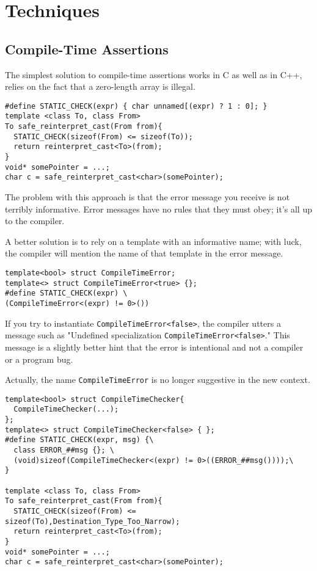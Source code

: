 \newpage
\section{Techniques}

\subsection{Compile-Time Assertions}

The simplest solution to compile-time assertions works in C as well as in
C++, relies on the fact that a zero-length array is illegal.

\begin{verbatim}
#define STATIC_CHECK(expr) { char unnamed[(expr) ? 1 : 0]; }
template <class To, class From>
To safe_reinterpret_cast(From from){
  STATIC_CHECK(sizeof(From) <= sizeof(To));
  return reinterpret_cast<To>(from);
}
void* somePointer = ...;
char c = safe_reinterpret_cast<char>(somePointer);
\end{verbatim}

The problem with this approach is that the error message you receive
is not terribly informative. Error messages have no rules that they
must obey; it's all up to the compiler.

A better solution is to rely on a template with an informative name;
with luck, the compiler will mention the name of that template in the
error message.

\begin{verbatim}
template<bool> struct CompileTimeError;
template<> struct CompileTimeError<true> {};
#define STATIC_CHECK(expr) \
(CompileTimeError<(expr) != 0>())
\end{verbatim}

If you try to instantiate
\texttt{CompileTimeError<false>}, the compiler utters a message such
as "Undefined specialization \texttt{CompileTimeError<false>}." This
message is a slightly better hint that the error is intentional and
not a compiler or a program bug.

Actually, the name \texttt{CompileTimeError} is no longer suggestive
in the new context.

\begin{verbatim}
template<bool> struct CompileTimeChecker{
  CompileTimeChecker(...);
};
template<> struct CompileTimeChecker<false> { };
#define STATIC_CHECK(expr, msg) {\
  class ERROR_##msg {}; \
  (void)sizeof(CompileTimeChecker<(expr) != 0>((ERROR_##msg())));\
}

template <class To, class From>
To safe_reinterpret_cast(From from){
  STATIC_CHECK(sizeof(From) <= sizeof(To),Destination_Type_Too_Narrow);
  return reinterpret_cast<To>(from);
}
void* somePointer = ...;
char c = safe_reinterpret_cast<char>(somePointer);
\end{verbatim}

